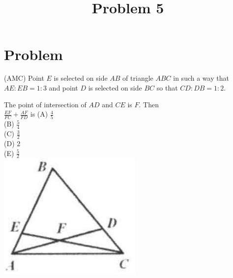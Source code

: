 \documentclass{article}
\title{Problem 5}
\date{}
\begin{document}
\maketitle

\section*{Problem}
(AMC) Point \(E\) is selected on side \(A B\) of triangle \(A B C\) in such a way that \(A E: E B=1: 3\) and point \(D\) is selected on side \(B C\) so that \(C D: D B=1: 2\).


The point of intersection of \(A D\) and \(C E\) is \(F\). Then\\
\(\frac{E F}{F C}+\frac{A F}{F D}\) is (A) \(\frac{4}{5}\)\\
(B) \(\frac{5}{4}\)\\
(C) \(\frac{3}{2}\)\\
(D) 2\\
(E) \(\frac{5}{2}\)\\
\centering
\includegraphics[width=\textwidth]{images/problem_image_1.jpg}
\end{document}
